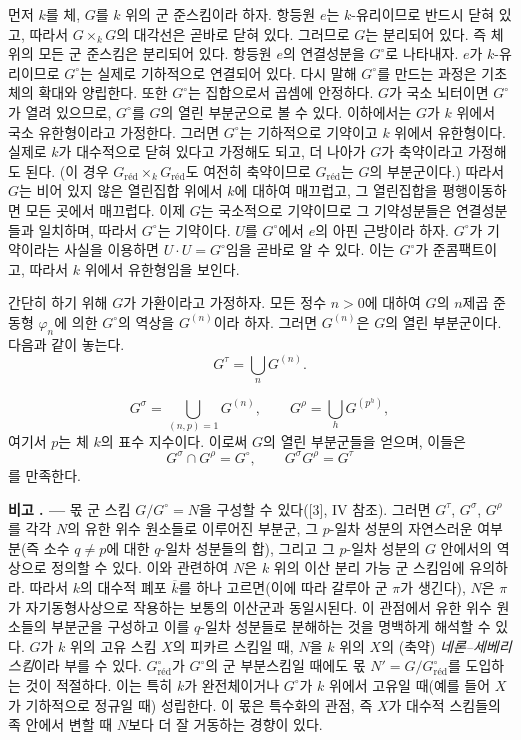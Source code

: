 \documentclass[11pt,twoside,openany]{book}
\numberwithin{equation}{section}
\newcommand{\sourceunit}{front}
\newcommand{\src}[1]{%
  \phantomsection\hypertarget{src:\sourceunit:#1}{}%
  \marginpar{\raggedleft\footnotesize\sffamily #1}%
}
\theoremstyle{plain}
\theoremstyle{definition}
\theoremstyle{remark}
\newcommand{\result}[2]{%
  \par\medskip\noindent\textbf{#1%
  \if\relax\detokenize{#2}\relax\else\space#2\fi. ---}\enspace
}
\begin{document}
먼저 $k$를 체, $G$를 $k$ 위의 군 준스킴이라 하자. 항등원 $e$는
$k$-유리이므로 반드시 닫혀 있고, 따라서 $G\times_kG$의 대각선은 곧바로
닫혀 있다. 그러므로 $G$는 분리되어 있다. 즉 체 위의 모든 군 준스킴은
분리되어 있다. 항등원 $e$의 연결성분을 $G^\circ$로 나타내자. $e$가
$k$-유리이므로 $G^\circ$는 실제로 기하적으로 연결되어 있다. 다시 말해
$G^\circ$를 만드는 과정은 기초체의 확대와 양립한다. 또한 $G^\circ$는
집합으로서 곱셈에 안정하다. $G$가 국소 뇌터이면 $G^\circ$가 열려
있으므로, $G^\circ$를 $G$의 열린 부분군으로 볼 수 있다. 이하에서는
$G$가 $k$ 위에서 국소 유한형이라고 가정한다. 그러면 $G^\circ$는
기하적으로 기약이고 $k$ 위에서 유한형이다. 실제로 $k$가 대수적으로
닫혀 있다고 가정해도 되고, 더 나아가 $G$가 축약이라고 가정해도 된다.
(이 경우 $G_{\mathrm{réd}}\times_kG_{\mathrm{réd}}$도 여전히 축약이므로
$G_{\mathrm{réd}}$는 $G$의 부분군이다.) 따라서 $G$는 비어 있지 않은
열린집합 위에서 $k$에 대하여 매끄럽고, 그 열린집합을 평행이동하면 모든
곳에서 매끄럽다. 이제 $G$는 국소적으로 기약이므로 그 기약성분들은
연결성분들과 일치하며, 따라서 $G^\circ$는 기약이다. $U$를 $G^\circ$에서
$e$의 아핀 근방이라 하자. $G^\circ$가 기약이라는 사실을 이용하면
$U\cdot U=G^\circ$임을 곧바로 알 수 있다. 이는 $G^\circ$가
준콤팩트이고, 따라서 $k$ 위에서 유한형임을 보인다.

간단히 하기 위해 $G$가 가환이라고 가정하자. 모든 정수 $n>0$에 대하여
$G$의 $n$제곱 준동형 $\varphi_n$에 의한 $G^\circ$의 역상을
$G^{(n)}$이라 하자. 그러면 $G^{(n)}$은 $G$의 열린 부분군이다. 다음과
같이 놓는다.
\[
G^\tau=\bigcup_nG^{(n)}.
\]

\src{223}
\[
G^\sigma=\bigcup_{(n,p)=1}G^{(n)},
\qquad
G^\rho=\bigcup_hG^{(p^h)},
\]
여기서 $p$는 체 $k$의 표수 지수이다. 이로써 $G$의 열린 부분군들을
얻으며, 이들은
\[
G^\sigma\cap G^\rho=G^\circ,
\qquad
G^\sigma G^\rho=G^\tau
\]
를 만족한다.

\result{비고}{} 몫 군 스킴 $G/G^\circ=N$을 구성할 수 있다([3], IV 참조).
그러면 $G^\tau$, $G^\sigma$, $G^\rho$를 각각 $N$의 유한 위수 원소들로
이루어진 부분군, 그 $p$-일차 성분의 자연스러운 여부분(즉 소수
$q\neq p$에 대한 $q$-일차 성분들의 합), 그리고 그 $p$-일차 성분의
$G$ 안에서의 역상으로 정의할 수 있다. 이와 관련하여 $N$은 $k$ 위의
이산 분리 가능 군 스킴임에 유의하라. 따라서 $k$의 대수적 폐포
$\overline k$를 하나 고르면(이에 따라 갈루아 군 $\pi$가 생긴다), $N$은
$\pi$가 자기동형사상으로 작용하는 보통의 이산군과 동일시된다. 이
관점에서 유한 위수 원소들의 부분군을 구성하고 이를 $q$-일차 성분들로
분해하는 것을 명백하게 해석할 수 있다. $G$가 $k$ 위의 고유 스킴 $X$의
피카르 스킴일 때, $N$을 $k$ 위의 $X$의 (축약)
\emph{네론--세베리 스킴}이라 부를 수 있다. $G^\circ_{\mathrm{réd}}$가
$G^\circ$의 군 부분스킴일 때에도 몫
$N'=G/G^\circ_{\mathrm{réd}}$를 도입하는 것이 적절하다. 이는 특히
$k$가 완전체이거나 $G^\circ$가 $k$ 위에서 고유일 때(예를 들어 $X$가
기하적으로 정규일 때) 성립한다. 이 몫은 특수화의 관점, 즉 $X$가
대수적 스킴들의 족 안에서 변할 때 $N$보다 더 잘 거동하는 경향이 있다.
\end{document}
